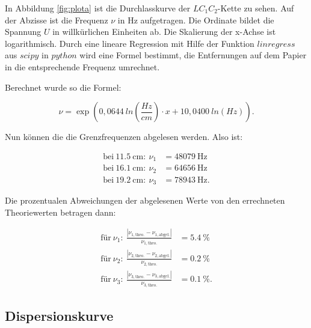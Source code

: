 \begin{figure*}[p]
  \centering
  \caption{Aufgenommene Durchlasskurve.}
  \label{fig:plota}
\end{figure*}

In Abbildung \ref{fig:plota} ist die Durchlasskurve der $LC_1C_2$-Kette zu
sehen. Auf der Abzisse ist die Frequenz $\nu$ in $\si{\hertz}$ aufgetragen. Die
Ordinate bildet die Spannung $U$ in willkürlichen Einheiten ab. Die Skalierung der x-Achse
 ist logarithmisch. Durch eine lineare
Regression mit Hilfe der Funktion $linregress$ aus $scipy$ \cite{scipy} in
$python$
wird eine Formel bestimmt, die Entfernungen auf dem Papier in die entsprechende
Frequenz umrechnet.

Berechnet wurde so die Formel:

\begin{equation}
  \nu = \exp(0,0644~ln(\frac{Hz}{cm})\cdot x + 10,0400~ln(Hz)).
\end{equation}

Nun können die die Grenzfrequenzen abgelesen werden. Also ist:

\begin{align*}
  \text{bei}~\SI{11,5}{\centi\meter}:~\nu_1 &= \SI{48079}{\hertz}\\
  \text{bei}~\SI{16,1}{\centi\meter}:~\nu_2 &= \SI{64656}{\hertz}\\
  \text{bei}~\SI{19,2}{\centi\meter}:~\nu_3 &= \SI{78943}{\hertz}.
\end{align*}

Die prozentualen Abweichungen der abgelesenen Werte von den errechneten
Theoriewerten betragen dann:

\begin{align*}
  \text{für}~\nu_1:~\frac{|\nu_{1,\text{theo.}}-\nu_{1,\text{abgel.}}|}{\nu_{1,\text{theo.}}}&= \SI{5,4}{\percent}\\
  \text{für}~\nu_2:~\frac{|\nu_{2,\text{theo.}}-\nu_{2,\text{abgel.}}|}{\nu_{2,\text{theo.}}}&= \SI{0,2}{\percent}\\
  \text{für}~\nu_3:~\frac{|\nu_{3,\text{theo.}}-\nu_{3,\text{abgel.}}|}{\nu_{3,\text{theo.}}}&= \SI{0,1}{\percent}.
\end{align*}

\subsection{Dispersionskurve}


